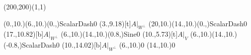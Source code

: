 \unitlength=1bp%

\begin{feynartspicture}(200,200)(1,1)

\FADiagram{}
\FAProp(0.,10.)(6.,10.)(0.,){ScalarDash}{0}
\FALabel(3.,9.18)[t]{$A|_{W^\perp}$}
\FAProp(20,10.)(14.,10.)(0.,){ScalarDash}{0}
\FALabel(17.,10.82)[b]{$A|_{W^\perp}$}
\FAProp(6.,10.)(14.,10.)(0.8,){Sine}{0}
\FALabel(10.,5.73)[t]{$A|_V$}
\FAProp(6.,10.)(14.,10.)(-0.8,){ScalarDash}{0}
\FALabel(10.,14.02)[b]{$A|_{W^\perp}$}
\FAVert(6.,10.){0}
\FAVert(14.,10.){0}
\end{feynartspicture}

